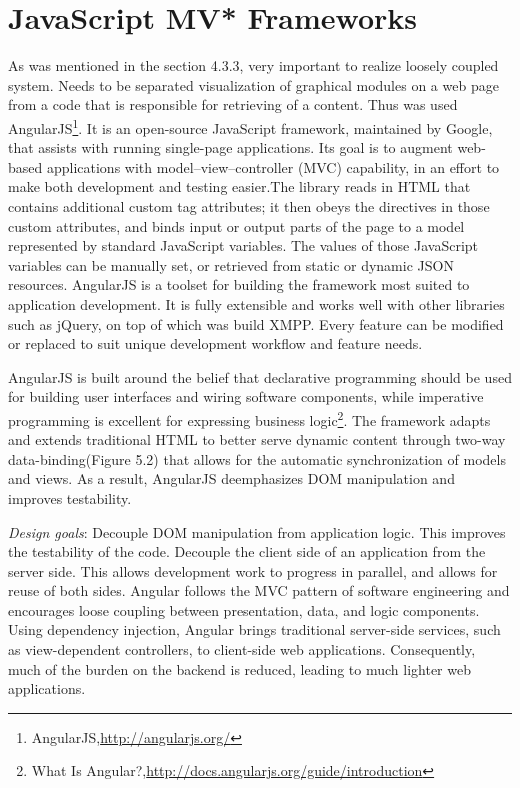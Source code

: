 \section{JavaScript MV* Frameworks}
	As was mentioned in the section 4.3.3, very important to realize loosely coupled system. Needs to be separated visualization of graphical modules on a web page from a code that is responsible for retrieving of a content. Thus was used AngularJS\footnote{AngularJS,\url{http://angularjs.org/}}. It is an open-source JavaScript framework, maintained by Google, that assists with running single-page applications. Its goal is to augment web-based applications with model–view–controller (MVC) capability, in an effort to make both development and testing easier.The library reads in HTML that contains additional custom tag attributes; it then obeys the directives in those custom attributes, and binds input or output parts of the page to a model represented by standard JavaScript variables. The values of those JavaScript variables can be manually set, or retrieved from static or dynamic JSON resources\cite{ wiki:angular}. AngularJS is a toolset for building the framework most suited to application development. It is fully extensible and works well with other libraries such as jQuery, on top of which was build XMPP. Every feature can be modified or replaced to suit unique development workflow and feature needs.

	AngularJS is built around the belief that declarative programming should be used for building user interfaces and wiring software components, while imperative programming is excellent for expressing business logic\footnote{What Is Angular?,\url{http://docs.angularjs.org/guide/introduction}}. The framework adapts and extends traditional HTML to better serve dynamic content through two-way data-binding(Figure 5.2) that allows for the automatic synchronization of models and views. As a result, AngularJS deemphasizes DOM manipulation and improves testability.

	\emph{Design goals}:
	\newline
	Decouple DOM manipulation from application logic. This improves the testability of the code. Decouple the client side of an application from the server side. This allows development work to progress in parallel, and allows for reuse of both sides.	Angular follows the MVC pattern of software engineering and encourages loose coupling between presentation, data, and logic components. Using dependency injection, Angular brings traditional server-side services, such as view-dependent controllers, to client-side web applications. Consequently, much of the burden on the backend is reduced, leading to much lighter web applications.

